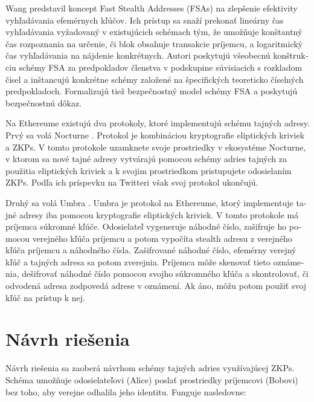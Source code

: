 \begin{otherlanguage}{slovak}
Wang \cite{Wang2023} predstavil koncept Fast Stealth Addresses (FSAs) na
zlepšenie efektivity vyhľadávania efemérnych kľúčov. Ich prístup sa snaží prekonať lineárny čas vyhľadávania
vyžadovaný v existujúcich schémach tým, že umožňuje konštantný čas rozpoznania
na určenie, či blok obsahuje transakcie príjemcu, a logaritmický čas
vyhľadávania na nájdenie konkrétnych. Autori poskytujú všeobecnú
konštrukciu schémy FSA za predpokladov členstva v podskupine súvisiacich s
rozkladom čisel a inštancujú konkrétne schémy založené na špecifických
teoreticko číselných predpokladoch. Formalizujú tiež bezpečnostný model schémy
FSA a poskytujú bezpečnostnú dôkaz.

Na Ethereume existujú dva protokoly, ktoré implementujú schému tajných adresy. Prvý
sa volá Nocturne \cite{nocturne}. Protokol je kombináciou kryptografie eliptických
kriviek a ZKPs. V tomto protokole uzamknete svoje prostriedky v ekosystéme Nocturne,
v ktorom sa nové tajné adresy vytvárajú pomocou schémy adries tajných za použitia eliptických kriviek a k
svojim prostriedkom pristupujete odosielaním ZKPs. Podľa ich príspevku na Twitteri však svoj protokol
ukončujú.

Druhý sa volá Umbra \cite{umbra}. Umbra je protokol na Ethereume, ktorý implementuje
tajné adresy iba pomocou kryptografie eliptických kriviek. V tomto protokole má
príjemca súkromné kľúče. Odosielateľ vygeneruje náhodné číslo, zašifruje ho
pomocou verejného kľúča príjemcu a potom vypočíta stealth adresu z verejného
kľúča príjemcu a náhodného čísla. Zašifrované náhodné číslo, efemérny verejný
kľúč a tajných adresa sa potom zverejnia. Príjemca môže skenovať tieto
oznámenia, dešifrovať náhodné číslo pomocou svojho súkromného kľúča a
skontrolovať, či odvodená adresa zodpovedá adrese v oznámení. Ak áno,
môžu potom použiť svoj kľúč na prístup k nej.

\section{Návrh riešenia}

Návrh riešenia sa zaoberá návrhom schémy tajných adries využívajúcej
ZKPs. Schéma umožňuje odosielateľovi (Alice) poslať
prostriedky príjemcovi (Bobovi) bez toho, aby verejne odhalila jeho
identitu. Funguje nasledovne:


\end{otherlanguage}
